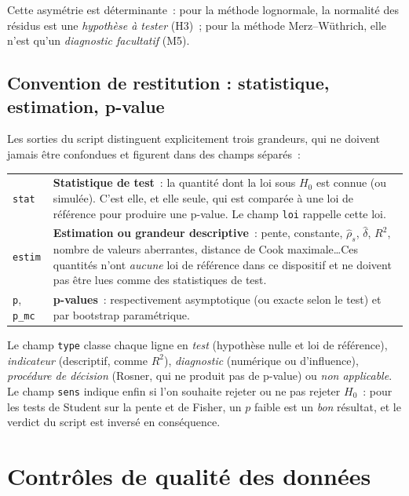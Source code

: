 \documentclass[a4paper,11pt]{article}
\newcommand{\code}[1]{\texttt{\small #1}}
\begin{document}
\noindent
Cette asymétrie est déterminante~: pour la méthode lognormale, la normalité des
résidus est une \emph{hypothèse à tester} (H3)~; pour la méthode Merz--Wüthrich,
elle n'est qu'un \emph{diagnostic facultatif} (M5).

\subsection*{Convention de restitution : statistique, estimation, p-value}

Les sorties du script distinguent explicitement trois grandeurs, qui ne doivent jamais être
confondues et figurent dans des champs séparés~:

\begin{center}
\small
\begin{tabular}{@{}p{2.3cm}p{12.9cm}@{}}
\toprule
\code{stat} & \textbf{Statistique de test}~: la quantité dont la loi sous $H_0$ est connue (ou
simulée). C'est elle, et elle seule, qui est comparée à une loi de référence pour produire une
p-value. Le champ \code{loi} rappelle cette loi. \\
\code{estim} & \textbf{Estimation ou grandeur descriptive}~: pente, constante, $\hat\rho_s$,
$\hat\delta$, $R^2$, nombre de valeurs aberrantes, distance de Cook maximale\dots Ces quantités
n'ont \emph{aucune} loi de référence dans ce dispositif et ne doivent pas être lues comme des
statistiques de test. \\
\code{p}, \code{p\_mc} & \textbf{p-values}~: respectivement asymptotique (ou exacte selon le
test) et par bootstrap paramétrique. \\
\bottomrule
\end{tabular}
\end{center}

Le champ \code{type} classe chaque ligne en \emph{test} (hypothèse nulle et loi de référence),
\emph{indicateur} (descriptif, comme $R^2$), \emph{diagnostic} (numérique ou d'influence),
\emph{procédure de décision} (Rosner, qui ne produit pas de p-value) ou \emph{non applicable}.
Le champ \code{sens} indique enfin si l'on souhaite rejeter ou ne pas rejeter $H_0$~: pour les
tests de Student sur la pente et de Fisher, un $p$ faible est un \emph{bon} résultat, et le
verdict du script est inversé en conséquence.

\clearpage
\section{Contrôles de qualité des données}
\end{document}
